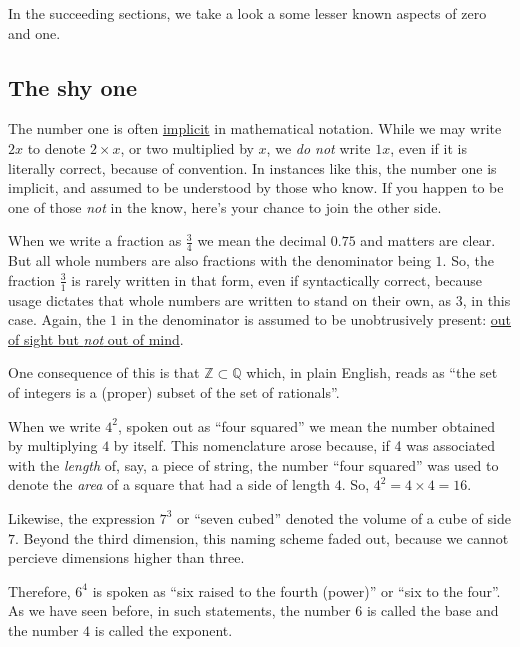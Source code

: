 \documentclass[
  a4paper,
]{article}
\begin{document}
In the succeeding sections, we take a look a some lesser known aspects
of zero and one.

\hypertarget{the-shy-one}{%
\subsection{The shy one}\label{the-shy-one}}

The number one is often
\href{https://www.vocabulary.com/dictionary/implicit}{implicit} in
mathematical notation. While we may write \(2x\) to denote
\(2\times x\), or two multiplied by \(x\), we \emph{do not} write
\(1x\), even if it is literally correct, because of convention. In
instances like this, the number one is implicit, and assumed to be
understood by those who know. If you happen to be one of those
\emph{not} in the know, here's your chance to join the other side.

When we write a fraction as \(\frac{3}{4}\) we mean the decimal \(0.75\)
and matters are clear. But all whole numbers are also fractions with the
denominator being \(1\). So, the fraction \(\frac{3}{1}\) is rarely
written in that form, even if syntactically correct, because usage
dictates that whole numbers are written to stand on their own, as \(3\),
in this case. Again, the \(1\) in the denominator is assumed to be
unobtrusively present:
\href{https://dictionary.cambridge.org/dictionary/english/out-of-sight-out-of-mind}{out
of sight but \emph{not} out of mind}.

One consequence of this is that \(\mathbb{Z} \subset \mathbb{Q}\) which,
in plain English, reads as ``the set of integers is a (proper) subset of
the set of rationals''.

When we write \(4^2\), spoken out as ``four squared'' we mean the number
obtained by multiplying \(4\) by itself. This nomenclature arose
because, if 4 was associated with the \emph{length} of, say, a piece of
string, the number ``four squared'' was used to denote the \emph{area}
of a square that had a side of length \(4\). So,
\(4^2 = 4\times4 = 16\).

Likewise, the expression \(7^3\) or ``seven cubed'' denoted the volume
of a cube of side \(7\). Beyond the third dimension, this naming scheme
faded out, because we cannot percieve dimensions higher than three.

Therefore, \(6^4\) is spoken as ``six raised to the fourth (power)'' or
``six to the four''. As we have seen before, in such statements, the
number \(6\) is called the base and the number \(4\) is called the
exponent.
\end{document}
